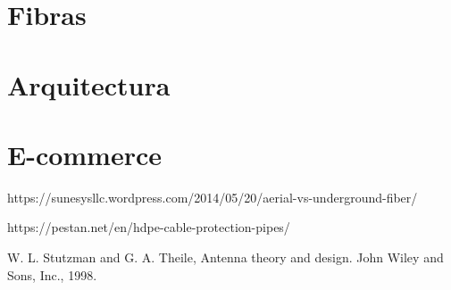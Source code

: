 \documentclass[12pt,letterpaper]{article}
\begin{document}
\newpage
\section{Fibras}

\newpage
\section{Arquitectura}

\newpage
\section{E-commerce}


\newpage
\begin{thebibliography}{20}
    https://sunesysllc.wordpress.com/2014/05/20/aerial-vs-underground-fiber/

    https://pestan.net/en/hdpe-cable-protection-pipes/
    

    W. L. Stutzman and G. A. Theile, Antenna theory and design. John Wiley and Sons, Inc., 1998.
\end{thebibliography}
\end{document}
